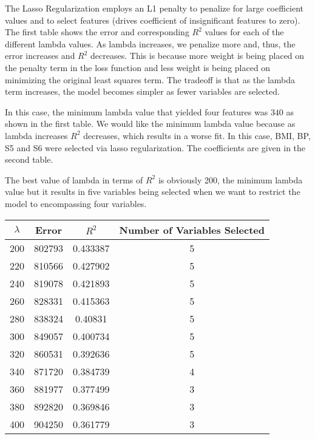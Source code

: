\documentclass[15pt,a4paper,openright]{article}
\begin{document}
The Lasso Regularization employs an L1 penalty to penalize for large coefficient values and to select features (drives coefficient of insignificant features to zero). The first table shows the error and corresponding $R^2$ values for each of the different lambda values. As lambda increases, we penalize more and, thus, the error increases and $R^2$ decreases. This is because more weight is being placed on the penalty term in the loss function and less weight is being placed on minimizing the original least squares term. The tradeoff is that as the lambda term increases, the model becomes simpler as fewer variables are selected.

In this case, the minimum lambda value that yielded four features was $340$ as shown in the first table. We would like the minimum lambda value because as lambda increases $R^2$ decreases, which results in a worse fit. In this case, BMI, BP, S5 and S6 were selected via lasso regularization. The coefficients are given in the second table. 

The best value of lambda in terms of $R^2$ is obviously 200, the minimum lambda value but it results in five variables being selected when we want to restrict the model to encompassing four variables. 

\begin{center}
 \begin{tabular}{||c | c | c| c ||} 
 \hline
 $\lambda$ & Error & $R^2$ & Number of Variables Selected \\ [0.5ex] 
 \hline\hline
  200 & 802793 & 0.433387 & 5 \\
  220 & 810566 & 0.427902 & 5\\
  240 & 819078 & 0.421893 & 5\\
  260 & 828331 & 0.415363 & 5\\
  280 & 838324 & 0.40831 & 5\\
  300 & 849057 & 0.400734 & 5\\
  320 & 860531 & 0.392636 & 5\\
  340 & 871720 & 0.384739 & 4\\
  360 & 881977 & 0.377499 & 3\\
  380 & 892820 & 0.369846 & 3\\
  400 & 904250 & 0.361779 & 3\\
 [1ex] 
 \hline
\end{tabular}
\end{center}
\end{document}
